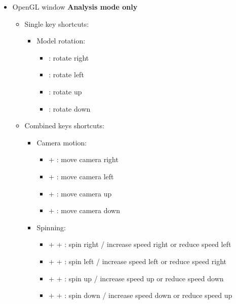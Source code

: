 {\begin{itemize}
\begin{itemize}
\begin{itemize}
\begin{itemize}
\item[] \Ctrl +  : enter / exit fullscreen mode 
\end{itemize}
\item Camero motion: 
\begin{itemize}
\item[] \Shift + \UArrow : zoom out
\item[] \Shift + \DArrow : zoom in
\end{itemize}
\end{itemize}
\end{itemize}
\item OpenGL window {\bf{Analysis mode only}}
\begin{itemize}
\item Single key shortcuts: 
\begin{itemize}
\item Model rotation: 
\begin{itemize}
\item[] \RArrow : rotate right
\item[] \LArrow : rotate left
\item[] \UArrow : rotate up
\item[] \DArrow : rotate down 
\end{itemize}
\end{itemize}
\item Combined keys shortcuts: 
\begin{itemize}
\item Camera motion: 
\begin{itemize}
\item[] \Ctrl + \RArrow : move camera right
\item[] \Ctrl + \LArrow : move camera left
\item[] \Ctrl + \UArrow : move camera up
\item[] \Ctrl + \DArrow : move camera down 
\end{itemize}
\item Spinning: 
\begin{itemize}
\item[] \Ctrl + \Shift + \RArrow : spin right / increase speed right or reduce speed left
\item[] \Ctrl + \Shift + \RArrow : spin left / increase speed left or reduce speed right
\item[] \Ctrl + \Shift + \UArrow : spin up / increase speed up or reduce speed down
\item[] \Ctrl + \Shift + \DArrow : spin down / increase speed down or reduce speed up 

\end{itemize}
\end{itemize}
\end{itemize}
\end{itemize}}
